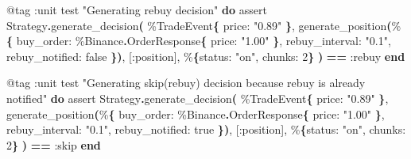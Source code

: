 \documentclass[
  oneside]{book}
\newenvironment{Shaded}{\begin{snugshade}}{\end{snugshade}}
\newcommand{\ConstantTok}[1]{\textcolor[rgb]{0.56,0.35,0.01}{#1}}
\newcommand{\DecValTok}[1]{\textcolor[rgb]{0.00,0.00,0.81}{#1}}
\newcommand{\FunctionTok}[1]{\textcolor[rgb]{0.13,0.29,0.53}{\textbf{#1}}}
\newcommand{\KeywordTok}[1]{\textcolor[rgb]{0.13,0.29,0.53}{\textbf{#1}}}
\newcommand{\NormalTok}[1]{#1}
\newcommand{\OperatorTok}[1]{\textcolor[rgb]{0.81,0.36,0.00}{\textbf{#1}}}
\newcommand{\OtherTok}[1]{\textcolor[rgb]{0.56,0.35,0.01}{#1}}
\newcommand{\StringTok}[1]{\textcolor[rgb]{0.31,0.60,0.02}{#1}}
\newcommand{\VariableTok}[1]{\textcolor[rgb]{0.00,0.00,0.00}{#1}}
\begin{document}
\begin{Shaded}
\begin{Highlighting}[]
  \OtherTok{@tag} \VariableTok{:unit}
\NormalTok{  test }\StringTok{"Generating rebuy decision"} \KeywordTok{do}
\NormalTok{    assert }\ConstantTok{Strategy}\OperatorTok{.}\NormalTok{generate\_decision}\FunctionTok{(}
\NormalTok{             \%}\ConstantTok{TradeEvent}\FunctionTok{\{}
               \VariableTok{price:} \StringTok{"0.89"}
             \FunctionTok{\}}\NormalTok{,}
\NormalTok{             generate\_position}\FunctionTok{(}\NormalTok{\%}\FunctionTok{\{}
               \VariableTok{buy\_order:}\NormalTok{ \%}\ConstantTok{Binance}\OperatorTok{.}\ConstantTok{OrderResponse}\FunctionTok{\{}
                 \VariableTok{price:} \StringTok{"1.00"}
               \FunctionTok{\}}\NormalTok{,}
               \VariableTok{rebuy\_interval:} \StringTok{"0.1"}\NormalTok{,}
               \VariableTok{rebuy\_notified:} \ConstantTok{false}
             \FunctionTok{\})}\NormalTok{,}
             \OtherTok{[}\VariableTok{:position}\OtherTok{]}\NormalTok{,}
\NormalTok{             \%}\FunctionTok{\{}\VariableTok{status:} \StringTok{"on"}\NormalTok{, }\VariableTok{chunks:} \DecValTok{2}\FunctionTok{\}}
           \FunctionTok{)} \OperatorTok{==} \VariableTok{:rebuy}
  \KeywordTok{end}

  \OtherTok{@tag} \VariableTok{:unit}
\NormalTok{  test }\StringTok{"Generating skip(rebuy) decision because rebuy is already notified"} \KeywordTok{do}
\NormalTok{    assert }\ConstantTok{Strategy}\OperatorTok{.}\NormalTok{generate\_decision}\FunctionTok{(}
\NormalTok{             \%}\ConstantTok{TradeEvent}\FunctionTok{\{}
               \VariableTok{price:} \StringTok{"0.89"}
             \FunctionTok{\}}\NormalTok{,}
\NormalTok{             generate\_position}\FunctionTok{(}\NormalTok{\%}\FunctionTok{\{}
               \VariableTok{buy\_order:}\NormalTok{ \%}\ConstantTok{Binance}\OperatorTok{.}\ConstantTok{OrderResponse}\FunctionTok{\{}
                 \VariableTok{price:} \StringTok{"1.00"}
               \FunctionTok{\}}\NormalTok{,}
               \VariableTok{rebuy\_interval:} \StringTok{"0.1"}\NormalTok{,}
               \VariableTok{rebuy\_notified:} \ConstantTok{true}
             \FunctionTok{\})}\NormalTok{,}
             \OtherTok{[}\VariableTok{:position}\OtherTok{]}\NormalTok{,}
\NormalTok{             \%}\FunctionTok{\{}\VariableTok{status:} \StringTok{"on"}\NormalTok{, }\VariableTok{chunks:} \DecValTok{2}\FunctionTok{\}}
           \FunctionTok{)} \OperatorTok{==} \VariableTok{:skip}
  \KeywordTok{end}


\end{Highlighting}
\end{Shaded}
\end{document}
